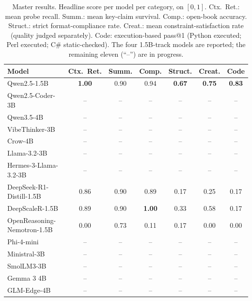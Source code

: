 \documentclass[runningheads]{llncs}
\begin{document}
\begin{table}[t]
\caption{Master results. Headline score per model per category, on $[0,1]$.
Ctx.\ Ret.: mean probe recall. Summ.: mean key-claim survival. Comp.: open-book
accuracy. Struct.: strict format-compliance rate. Creat.: mean
constraint-satisfaction rate (quality judged separately). Code: execution-based
pass@1 (Python executed; Perl executed; C\# static-checked). The four 1.5B-track
models are reported; the remaining eleven (``--'') are in progress.}
\label{tab:results}
\centering
\footnotesize
\setlength{\tabcolsep}{4pt}
\begin{tabular}{@{}lcccccc@{}}
\toprule
Model & Ctx.\ Ret. & Summ. & Comp. & Struct. & Creat. & Code \\
\midrule
Qwen2.5-1.5B                & \textbf{1.00} & 0.90 & 0.94 & \textbf{0.67} & \textbf{0.75} & \textbf{0.83} \\
Qwen2.5-Coder-3B            & -- & -- & -- & -- & -- & -- \\
Qwen3.5-4B                  & -- & -- & -- & -- & -- & -- \\
VibeThinker-3B              & -- & -- & -- & -- & -- & -- \\
Crow-4B                     & -- & -- & -- & -- & -- & -- \\
Llama-3.2-3B                & -- & -- & -- & -- & -- & -- \\
Hermes-3-Llama-3.2-3B       & -- & -- & -- & -- & -- & -- \\
DeepSeek-R1-Distill-1.5B    & 0.86 & 0.90 & 0.89 & 0.17 & 0.25 & 0.17 \\
DeepScaleR-1.5B             & 0.89 & 0.90 & \textbf{1.00} & 0.33 & 0.58 & 0.17 \\
OpenReasoning-Nemotron-1.5B & 0.00 & 0.73 & 0.11 & 0.17 & 0.00 & 0.00 \\
Phi-4-mini                  & -- & -- & -- & -- & -- & -- \\
Ministral-3B                & -- & -- & -- & -- & -- & -- \\
SmolLM3-3B                  & -- & -- & -- & -- & -- & -- \\
Gemma 3 4B                  & -- & -- & -- & -- & -- & -- \\
GLM-Edge-4B                 & -- & -- & -- & -- & -- & -- \\
\bottomrule
\end{tabular}
\end{table}
\end{document}
